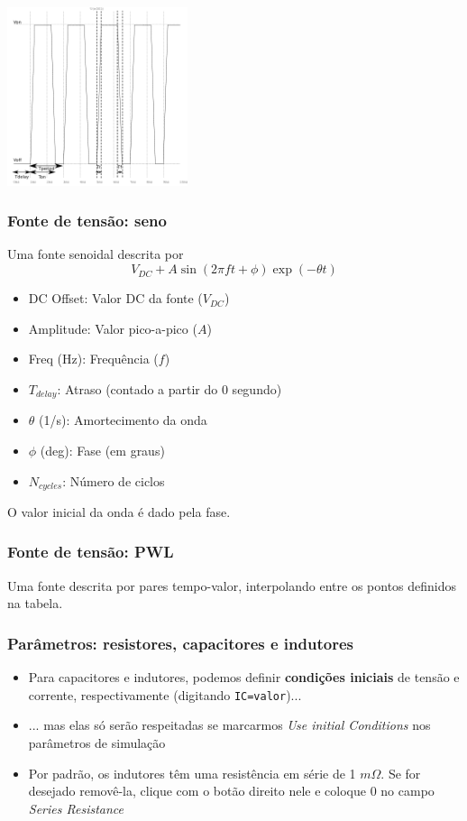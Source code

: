 \documentclass{beamer}
\begin{document}
 \begin{frame}
 \begin{center}
 \includegraphics[width=200px]{images/square_wave}
 \end{center}
 \end{frame}
\begin{frame} %
\frametitle{Fonte de tensão: seno}
Uma fonte senoidal descrita por
\begin{equation}
V_{DC} + A \sin (2 \pi f t + \phi) \exp(-\theta t)
\end{equation}
\begin{itemize}
\item{DC Offset}: Valor DC da fonte ($V_{DC}$)
\item{Amplitude}: Valor pico-a-pico ($A$)
\item{Freq (Hz)}: Frequência ($f$)
\item{$T_{delay}$}: Atraso (contado a partir do 0 segundo)
\item{$\theta$ (1/s)}: Amortecimento da onda
\item{$\phi$ (deg)}: Fase (em graus)
\item{$N_{cycles}$}: Número de ciclos
\end{itemize}
O valor inicial da onda é dado pela fase.
\end{frame}

\begin{frame}
\frametitle{Fonte de tensão: PWL}
Uma fonte descrita por pares tempo-valor, interpolando entre os pontos definidos na tabela.
\end{frame}

\begin{frame}
\frametitle{Parâmetros: resistores, capacitores e indutores}
\begin{itemize}
\item{Para capacitores e indutores, podemos definir \textbf{condições iniciais} de tensão e corrente, respectivamente (digitando \texttt{IC=valor})...}
\item{... mas elas só serão respeitadas se marcarmos \textit{Use initial Conditions} nos parâmetros de simulação}
\item{Por padrão, os indutores têm uma resistência em série de 1 $m\Omega$. Se for desejado removê-la, clique com o botão direito nele e coloque 0 no campo \textit{Series Resistance}}
\end{itemize}
\end{frame}
\end{document}
